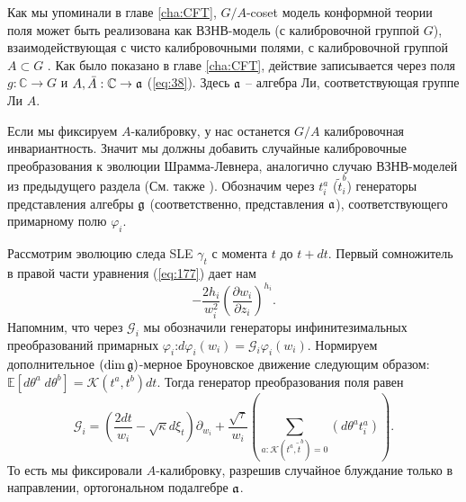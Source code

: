 Как мы упоминали в главе \ref{cha:CFT}, $G/A$-coset модель конформной теории поля может быть реализована как ВЗНВ-модель (с калибровочной группой $G$), взаимодействующая с чисто калибровочными полями, с калибровочной группой $A\subset G$ \cite{gawdzki1988g,figueroa89equivalence}. Как было показано в главе \ref{cha:CFT}, действие записывается через поля  $g:\mathbb{C}\to G$ и $A,\bar A:\mathbb{C}\to \mathfrak{a}$ (\ref{eq:38}). Здесь $\mathfrak{a}$ -- алгебра Ли, соответствующая группе Ли $A$.

Если мы фиксируем  $A$-калибровку, у нас останется  $G/A$ калибровочная инвариантность. Значит мы должны добавить случайные калибровочные преобразования к эволюции Шрамма-Левнера, аналогично случаю ВЗНВ-моделей из предыдущего раздела (См. также \cite{bettelheim2005stochastic}).  Обозначим через $t^{a}_{i}$ ($\tilde{t}^{b}_{i}$) генераторы представления алгебры $\mathfrak{g}$ (соответственно, представления $\mathfrak{a}$), соответствующего примарному полю $\varphi_{i}$.

Рассмотрим эволюцию следа SLE $\gamma_{t}$ с момента   $t$ до $t+ dt$.  Первый сомножитель в правой части уравнения (\ref{eq:177}) дает нам
\begin{equation*}
  -\frac{2h_{i}}{w_{i}^{2}}\left(\frac{\partial w_{i}}{\partial z_{i}}\right)^{h_{i}}.
\end{equation*}
Напомним, что через  $\mathcal{G}_{i}$ мы обозначили  генераторы инфинитезимальных преобразований примарных $\varphi_{i}$:$d\varphi_{i}(w_{i}) = \mathcal{G}_{i}\varphi_{i}(w_{i})$. Нормируем дополнительное $\left(\dim\mathfrak{g}\right)$-мерное Броуновское движение следующим образом: $\mathbb  {E}\left[d\theta^{a}\; d\theta^{b}\right]=\mathcal{K}(t^{a},t^{b})dt$. Тогда генератор преобразования поля равен
\begin{equation}
  \mathcal{G}_{i}=\left(\frac{2dt}{w_{i}}-\sqrt{\kappa} d\xi_{t}\right) \partial_{w_{i}}+\frac{\sqrt{\tau}}{w_{i}}\left(\sum_{a:\mathcal{K}(t^{a},\tilde{t}^{b})=0}\left(d \theta ^{a} t^{a}_{i}\right)\right).
\label{eq:179}
\end{equation}
То есть мы фиксировали  $A$-калибровку, разрешив случайное блуждание только в направлении, ортогональном подалгебре $\mathfrak{a}$. 


